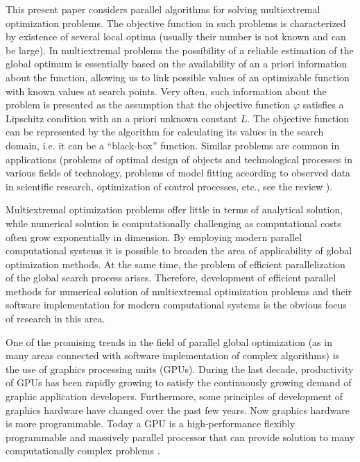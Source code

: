 \documentclass[smallcondensed]{svjour3}     %
\begin{document}
This present paper considers parallel algorithms for solving multiextremal optimization problems. The objective function in such problems is characterized by existence of several local optima (usually their number is not known and can be large). In multiextremal problems the possibility of a reliable estimation of the global optimum is essentially based on the availability of an a priori information about the function, allowing us to link possible values of an optimizable function with known values at search points. Very often, such information about the problem is presented as the assumption that the objective function $\varphi$ satisfies a Lipschitz condition with an a priori unknown constant $L$. The objective function can be represented by the algorithm for calculating its values in the search domain, i.e. it can be a ``black-box'' function. Similar problems are common in applications (problems of optimal design of objects and technological processes in various fields of technology, problems of model fitting according to observed data in scientific research, optimization of control processes, etc., see the review \cite{RefPinter}).

Multiextremal optimization problems offer little in terms of analytical solution, while numerical solution is computationally challenging as computational costs often grow exponentially in dimension. By employing modern parallel computational systems it is possible to broaden the area of applicability of global optimization methods. At the same time, the problem of efficient parallelization of the global search process arises. Therefore, development of efficient parallel methods for numerical solution of multiextremal optimization problems and their software implementation for modern computational systems is the obvious focus of research in this area.

One of the promising trends in the field of parallel global optimization (as in many areas connected with software implementation of complex algorithms) is the use of graphics processing units (GPUs). During the last decade, productivity of GPUs has been rapidly growing to satisfy the continuously growing demand of graphic application developers. Furthermore, some principles of development of graphics hardware have changed over the past few years. Now graphics hardware is more programmable. Today a GPU is a high-performance flexibly programmable and massively parallel processor that can provide solution to many computationally complex problems \cite{RefHwu}.
\end{document}
